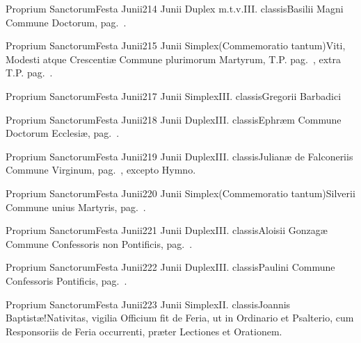 \documentclass[nocturnale-romanum.tex]{subfiles}
\begin{document}
	{Proprium Sanctorum}{Festa Junii}{2}{14 Junii}
	{Duplex m.t.v.}{III. classis}{Basilii Magni}
	{Commune Doctorum, pag.\ \pageref{M-CODO}.}
	{}

	{Proprium Sanctorum}{Festa Junii}{2}{15 Junii}
	{Simplex}{(Commemoratio tantum)}{Viti, Modesti atque Crescentiæ}
	{Commune plurimorum Martyrum, T.P. pag.\ \pageref{M-MRTP}, extra T.P. pag.\ \pageref{M-PMEX}.}
	{}

	{Proprium Sanctorum}{Festa Junii}{2}{17 Junii}
	{Simplex}{III. classis}{Gregorii Barbadici}
	{}
	{}

	{Proprium Sanctorum}{Festa Junii}{2}{18 Junii}
	{Duplex}{III. classis}{Ephræm}
	{Commune Doctorum Ecclesiæ, pag.\ \pageref{M-CODO}.}
	{}

	{Proprium Sanctorum}{Festa Junii}{2}{19 Junii}
	{Duplex}{III. classis}{Julianæ de Falconeriis}
	{Commune Virginum, pag.\ \pageref{M-MU}, excepto Hymno.}
	{}

	{Proprium Sanctorum}{Festa Junii}{2}{20 Junii}
	{Simplex}{(Commemoratio tantum)}{Silverii}
	{Commune unius Martyris, pag.\ \pageref{M-UMEX}.}
	{}

	{Proprium Sanctorum}{Festa Junii}{2}{21 Junii}
	{Duplex}{III. classis}{Aloisii Gonzagæ}
	{Commune Confessoris non Pontificis, pag.\ \pageref{M-CONP}.}
	{}

	{Proprium Sanctorum}{Festa Junii}{2}{22 Junii}
	{Duplex}{III. classis}{Paulini}
	{Commune Confessoris Pontificis, pag.\ \pageref{M-COPO}.}
	{}

	{Proprium Sanctorum}{Festa Junii}{2}{23 Junii}
	{Simplex}{II. classis}{Joannis Baptistæ!Nativitas, vigilia}
	{Officium fit de Feria, ut in Ordinario et Psalterio, cum Responsoriis de Feria occurrenti, præter Lectiones et Orationem.}
	{}
\end{document}
